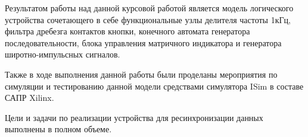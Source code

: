 \Conclusion %

Результатом работы над данной курсовой работой является модель логического устройства сочетающего в себе функциональные узлы делителя частоты 1кГц, фильтра дребезга контактов
кнопки, конечного автомата генератора последовательности, блока управления матричного индикатора и генератора широтно-импульсных сигналов. 

Также в ходе выполнения данной работы были проделаны мероприятия по симуляции и тестированию данной модели средствами симулятора ISim в составе САПР Xilinx. 


Цели и задачи по реализации устройства для ресинхронизации данных выполнены в полном объеме. 

